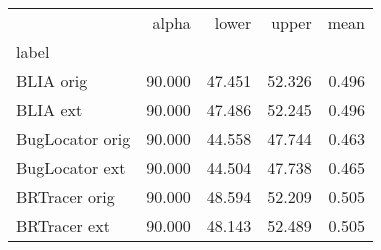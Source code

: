 \begin{tabular}{lrrrr}
\toprule
{} &  alpha &  lower &  upper &  mean \\
label           &        &        &        &       \\
\midrule
BLIA orig       & 90.000 & 47.451 & 52.326 & 0.496 \\
BLIA ext        & 90.000 & 47.486 & 52.245 & 0.496 \\
BugLocator orig & 90.000 & 44.558 & 47.744 & 0.463 \\
BugLocator ext  & 90.000 & 44.504 & 47.738 & 0.465 \\
BRTracer orig   & 90.000 & 48.594 & 52.209 & 0.505 \\
BRTracer ext    & 90.000 & 48.143 & 52.489 & 0.505 \\
\bottomrule
\end{tabular}
